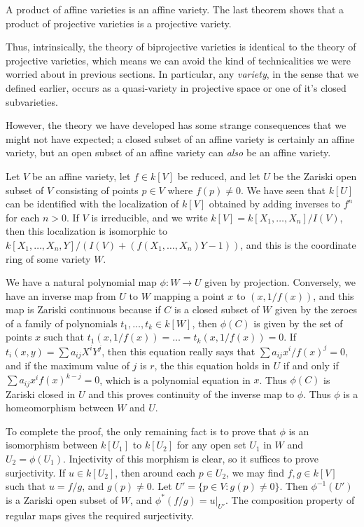 \begin{example}
    A product of affine varieties is an affine variety. The last theorem shows that a product of projective varieties is a projective variety.
\end{example}

Thus, intrinsically, the theory of biprojective varieties is identical to the theory of projective varieties, which means we can avoid the kind of technicalities we were worried about in previous sections. In particular, any \emph{variety}, in the sense that we defined earlier, occurs as a quasi-variety in projective space or one of it's closed subvarieties.

However, the theory we have developed has some strange consequences that we might not have expected; a closed subset of an affine variety is certainly an affine variety, but an open subset of an affine variety can \emph{also} be an affine variety.

\begin{example}
    Let $V$ be an affine variety, let $f \in k[V]$ be reduced, and let $U$ be the Zariski open subset of $V$ consisting of points $p \in V$ where $f(p) \neq 0$. We have seen that $k[U]$ can be identified with the localization of $k[V]$ obtained by adding inverses to $f^n$ for each $n > 0$. If $V$ is irreducible, and we write $k[V] = k[X_1,\dots,X_n]/I(V)$, then this localization is isomorphic to $k[X_1,\dots,X_n,Y]/(I(V) + (f(X_1,\dots,X_n)Y - 1))$, and this is the coordinate ring of some variety $W$.

    We have a natural polynomial map $\phi: W \to U$ given by projection. Conversely, we have an inverse map from $U$ to $W$ mapping a point $x$ to $(x,1/f(x))$, and this map is Zariski continuous because if $C$ is a closed subset of $W$ given by the zeroes of a family of polynomials $t_1,\dots,t_k \in k[W]$, then $\phi(C)$ is given by the set of points $x$ such that $t_1(x,1/f(x)) = \dots = t_k(x,1/f(x)) = 0$. If $t_i(x,y) = \sum a_{ij} X^i Y^j$, then this equation really says that $\sum a_{ij} x^i / f(x)^j = 0$, and if the maximum value of $j$ is $r$, the this equation holds in $U$ if and only if $\sum a_{ij} x^i f(x)^{k-j} = 0$, which is a polynomial equation in $x$. Thus $\phi(C)$ is Zariski closed in $U$ and this proves continuity of the inverse map to $\phi$. Thus $\phi$ is a homeomorphism between $W$ and $U$.

    To complete the proof, the only remaining fact is to prove that $\phi$ is an isomorphism between $k[U_1]$ to $k[U_2]$ for any open set $U_1$ in $W$ and $U_2 = \phi(U_1)$. Injectivity of this morphism is clear, so it suffices to prove surjectivity. If $u \in k[U_2]$, then around each $p \in U_2$, we may find $f,g \in k[V]$ such that $u = f/g$, and $g(p) \neq 0$. Let $U' = \{ p \in V : g(p) \neq 0 \}$. Then $\phi^{-1}(U')$ is a Zariski open subset of $W$, and $\phi^*(f/g) = u|_{U'}$. The composition property of regular maps gives the required surjectivity.
\end{example}

